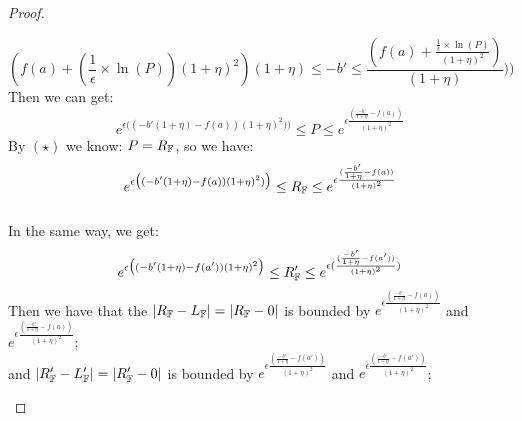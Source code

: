 \documentclass[a4paper,11pt]{article}
\begin{document}
\begin{proof}
\begin{itemize}
\[		(f(a) + 
				(\frac{1}{\epsilon} \times \ln(P))
				(1 + \eta)^2)
				{(1 + \eta)}
		\leq
		-b'
		\leq
		\frac{(
				f(a) + \frac{\frac{1}{\epsilon} 
				\times \ln(P)}
				{(1 + \eta)^2}
				)}
				{(1 + \eta)}
				 \big)
				\bigg)
		\]
		Then we can get:
		\[
		e^{\epsilon 
		\big( (-b'(1 + \eta) - f(a)) (1 + \eta)^2) \big)}
		\leq
		P
		\leq
		e^{\epsilon 
		\frac{(\frac{-b'}{1 + \eta} - f(a))}{(1 + \eta)^2}}
		\]
		By $(\star)$ we know: $P = R_{\mathbb{F}}$, so we have:
		\[
		e^{\epsilon 
		\big( (-b'(1 + \eta) - f(a)) (1 + \eta)^2) \big)}
		\leq
		R_{\mathbb{F}}
		\leq
		e^{\epsilon 
		\frac{(\frac{-b'}{1 + \eta} - f(a))}{(1 + \eta)^2}}
		\]
		\\		
		In the same way, we get:
		\[
		e^{\epsilon 
		\big((-b'(1 + \eta) - f(a'))(1 + \eta)^2 \big)}
		\leq
		R_{\mathbb{F}}'
		\leq
		e^{\epsilon 
		(\frac{(\frac{-b'}{1 + \eta} - f(a'))}{(1 + \eta)^2})}
		\]
		Then we have that the $|R_{\mathbb{F}} - L_{\mathbb{F}}| = |R_{\mathbb{F}} - 0|$ is bounded by 
		$e^{\epsilon 
		\frac{(\frac{-b'}{1 + \eta} - f(a))}{(1 + \eta)^2}}$ 
		and $e^{\epsilon 
		\frac{(\frac{-b'}{1 + \eta} - f(a))}{(1 + \eta)^2}}$;
		\\
		and $|R_{\mathbb{F}}' - L_{\mathbb{F}}'| = |R_{\mathbb{F}}' - 0|$ is bounded by 
		$e^{\epsilon 
		\frac{(\frac{-b'}{1 + \eta} - f(a'))}{(1 + \eta)^2}}$ 
		and $e^{\epsilon 
		\frac{(\frac{-b'}{1 + \eta} - f(a'))}{(1 + \eta)^2}}$;
		


\end{itemize}
\end{proof}
\end{document}
